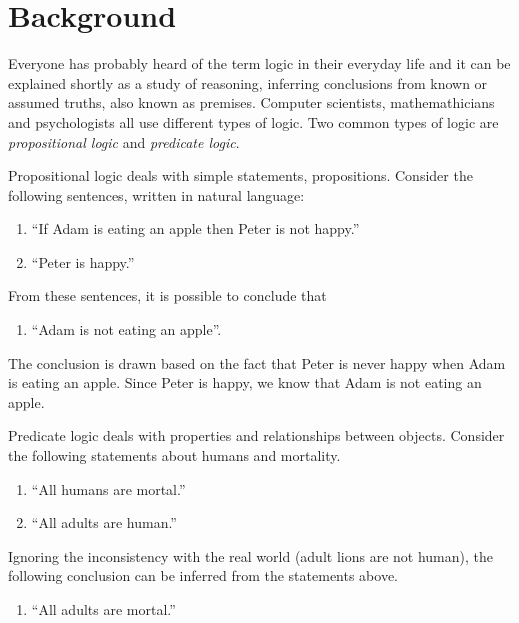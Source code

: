 \section{Background}

Everyone has probably heard of the term logic in their everyday life and it can be explained shortly as a study of reasoning, inferring conclusions from known or assumed truths, also known as premises. Computer scientists, mathemathicians and psychologists all use different types of logic. Two common types of logic are \textit{propositional logic} and \textit{predicate logic}.

Propositional logic deals with simple statements, propositions. Consider the following sentences, written in natural language:

\begin{enumerate}
      \item ``If Adam is eating an apple then Peter is not happy.''
      \item ``Peter is happy.''
\end{enumerate}

From these sentences, it is possible to conclude that

\begin{enumerate}[resume]
      \item ``Adam is not eating an apple''.
\end{enumerate}

The conclusion is drawn based on the fact that Peter is never happy when Adam is eating an apple. Since Peter is happy, we know that Adam is not eating an apple.

Predicate logic deals with properties and relationships between objects. Consider the following statements about humans and mortality.

\begin{enumerate}[resume]
      \item ``All humans are mortal.''
      \item ``All adults are human.''
\end{enumerate}

Ignoring the inconsistency with the real world (adult lions are not human), the following conclusion can be inferred from the statements above.

\begin{enumerate}[resume]
      \item ``All adults are mortal.''
\end{enumerate}

